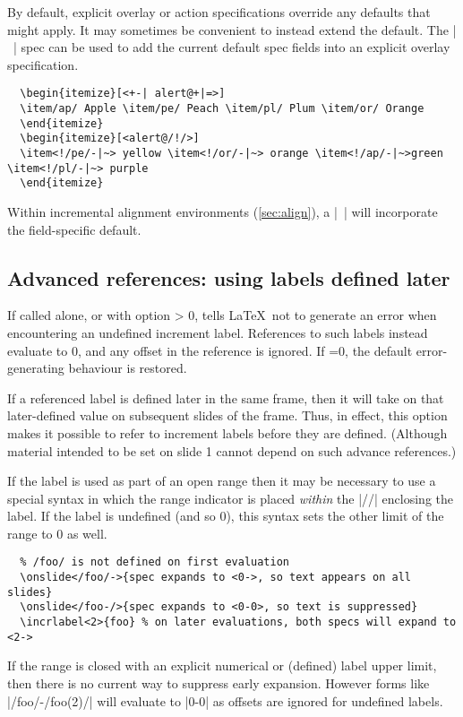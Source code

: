 \documentclass[a4paper]{ltxdoc}
\begin{document}
By default, explicit overlay or action specifications override any defaults that
might apply.  It may sometimes be convenient to instead extend the default.  The
|~| spec can be used to add the current default spec fields into an explicit
overlay specification.
\example
\begin{verbatim}
  \begin{itemize}[<+-| alert@+|=>]
  \item/ap/ Apple \item/pe/ Peach \item/pl/ Plum \item/or/ Orange
  \end{itemize}
  \begin{itemize}[<alert@/!/>]
  \item<!/pe/-|~> yellow \item<!/or/-|~> orange \item<!/ap/-|~>green \item<!/pl/-|~> purple
  \end{itemize}
\end{verbatim}
Within incremental alignment environments (\cref{sec:align}), a |~| will
incorporate the field-specific default.


\subsection{Advanced references: using labels defined later} \label{sec:labels:advanced}

\begin{command}{\allowundefinedincrlabels{}}
  If called alone, or with option  > 0, tells \LaTeX\ not to
  generate an error when encountering an undefined increment label.  References
  to such labels instead evaluate to 0, and any offset in the reference is
  ignored.  If =0, the default error-generating behaviour is
  restored.
\end{command}
If a referenced label is defined later in the same frame, then it will take on
that later-defined value on subsequent slides of the frame.  Thus, in effect,
this option makes it possible to refer to increment labels before they are
defined.  (Although material intended to be set on slide 1 cannot depend on such
advance references.)

If the label is used as part of an open range then it may be necessary to use a
special syntax in which the range indicator is placed \emph{within} the |//|
enclosing the label.  If the label is undefined (and so 0), this syntax sets the
other limit of the range to 0 as well.
\example
\begin{verbatim}
  % /foo/ is not defined on first evaluation
  \onslide</foo/->{spec expands to <0->, so text appears on all slides}
  \onslide</foo-/>{spec expands to <0-0>, so text is suppressed}
  \incrlabel<2>{foo} % on later evaluations, both specs will expand to <2->
\end{verbatim}
If the range is closed with an explicit numerical or (defined) label upper
limit, then there is no current way to suppress early expansion.  However forms
like |/foo/-/foo(2)/| will evaluate to |0-0| as offsets are ignored for
undefined labels.
\end{document}
